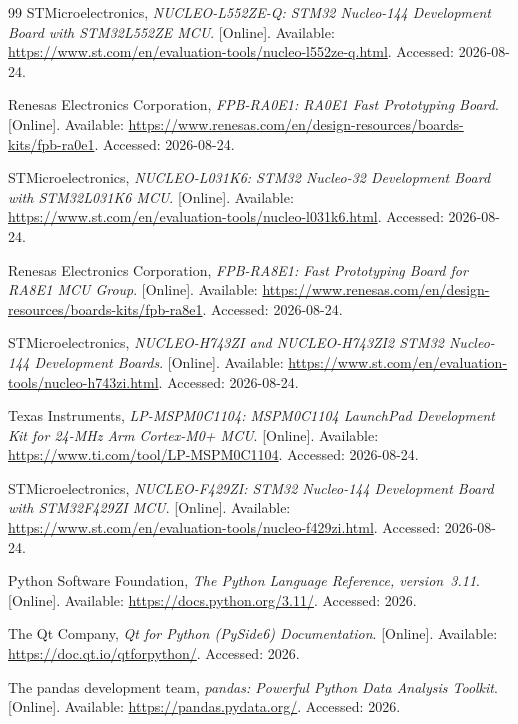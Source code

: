 \documentclass[12pt,a4paper,oneside]{book}
\begin{document}
\begin{thebibliography}{99}
STMicroelectronics, \emph{NUCLEO-L552ZE-Q: STM32 Nucleo-144 Development Board with STM32L552ZE MCU}. [Online]. Available: \url{https://www.st.com/en/evaluation-tools/nucleo-l552ze-q.html}. Accessed: 2026-08-24.

Renesas Electronics Corporation, \emph{FPB-RA0E1: RA0E1 Fast Prototyping Board}. [Online]. Available: \url{https://www.renesas.com/en/design-resources/boards-kits/fpb-ra0e1}. Accessed: 2026-08-24.

STMicroelectronics, \emph{NUCLEO-L031K6: STM32 Nucleo-32 Development Board with STM32L031K6 MCU}. [Online]. Available: \url{https://www.st.com/en/evaluation-tools/nucleo-l031k6.html}. Accessed: 2026-08-24.

Renesas Electronics Corporation, \emph{FPB-RA8E1: Fast Prototyping Board for RA8E1 MCU Group}. [Online]. Available: \url{https://www.renesas.com/en/design-resources/boards-kits/fpb-ra8e1}. Accessed: 2026-08-24.

STMicroelectronics, \emph{NUCLEO-H743ZI and NUCLEO-H743ZI2 STM32 Nucleo-144 Development Boards}. [Online]. Available: \url{https://www.st.com/en/evaluation-tools/nucleo-h743zi.html}. Accessed: 2026-08-24.

Texas Instruments, \emph{LP-MSPM0C1104: MSPM0C1104 LaunchPad Development Kit for 24-MHz Arm Cortex-M0+ MCU}. [Online]. Available: \url{https://www.ti.com/tool/LP-MSPM0C1104}. Accessed: 2026-08-24.

STMicroelectronics, \emph{NUCLEO-F429ZI: STM32 Nucleo-144 Development Board with STM32F429ZI MCU}. [Online]. Available: \url{https://www.st.com/en/evaluation-tools/nucleo-f429zi.html}. Accessed: 2026-08-24.


Python Software Foundation, \emph{The Python Language Reference, version~3.11}. [Online]. Available: \url{https://docs.python.org/3.11/}. Accessed: 2026.

The Qt Company, \emph{Qt for Python (PySide6) Documentation}. [Online]. Available: \url{https://doc.qt.io/qtforpython/}. Accessed: 2026.

The pandas development team, \emph{pandas: Powerful Python Data Analysis Toolkit}. [Online]. Available: \url{https://pandas.pydata.org/}. Accessed: 2026.


\end{thebibliography}
\end{document}

